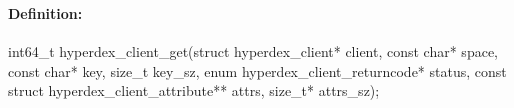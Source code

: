 %
%
%


\pagebreak
\subsubsection{}
\label{api:c:get}


\paragraph{Definition:}
\begin{ccode}
int64_t hyperdex_client_get(struct hyperdex_client* client,
        const char* space,
        const char* key, size_t key_sz,
        enum hyperdex_client_returncode* status,
        const struct hyperdex_client_attribute** attrs, size_t* attrs_sz);
\end{ccode}


